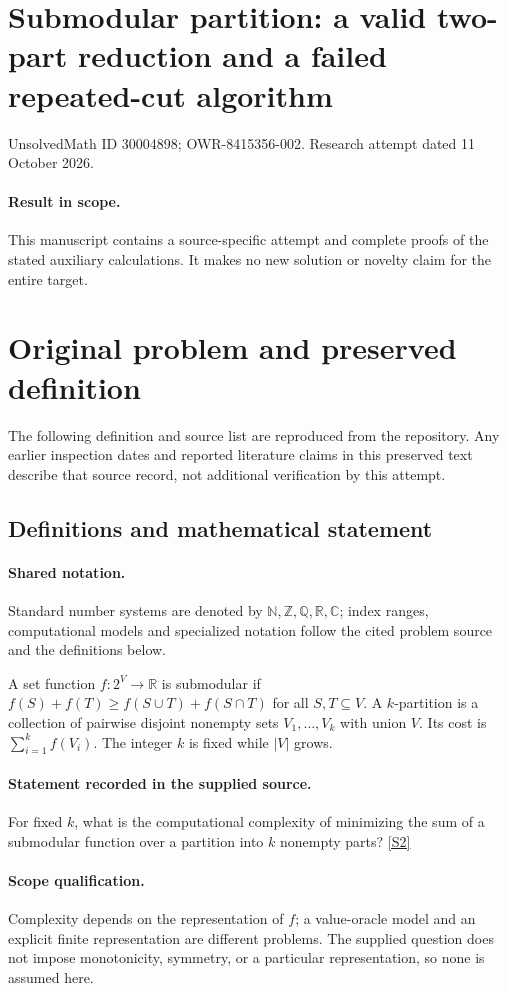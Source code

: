 \documentclass[11pt]{article}
\begin{document}
\section*{Submodular partition: a valid two-part reduction and a failed repeated-cut algorithm}
\noindent UnsolvedMath ID 30004898; OWR-8415356-002. Research attempt dated 11 October 2026.
\paragraph{Result in scope.}This manuscript contains a source-specific attempt and complete proofs of the stated auxiliary calculations. It makes no new solution or novelty claim for the entire target.
\section{Original problem and preserved definition}
The following definition and source list are reproduced from the repository. Any earlier inspection dates and reported literature claims in this preserved text describe that source record, not additional verification by this attempt.
\subsection{Definitions and mathematical statement}

\paragraph{Shared notation.}Standard number systems are denoted by $\mathbb N,\mathbb Z,\mathbb Q,\mathbb R,\mathbb C$; index ranges, computational models and specialized notation follow the cited problem source and the definitions below.


A set function $f:2^V\to\mathbb R$ is submodular if $f(S)+f(T)\geq f(S\cup T)+f(S\cap T)$ for all $S,T\subseteq V$. A $k$-partition is a collection of pairwise disjoint nonempty sets $V_1,\ldots,V_k$ with union $V$. Its cost is $\sum_{i=1}^kf(V_i)$. The integer $k$ is fixed while $|V|$ grows.
\paragraph{Statement recorded in the supplied source.}
For fixed $k$, what is the computational complexity of minimizing the sum of a submodular function over a partition into $k$ nonempty parts? \href{https://doi.org/10.4171/owr/2021/53}{[S2]}
\paragraph{Scope qualification.}
Complexity depends on the representation of $f$; a value-oracle model and an explicit finite representation are different problems. The supplied question does not impose monotonicity, symmetry, or a particular representation, so none is assumed here.
\end{document}
